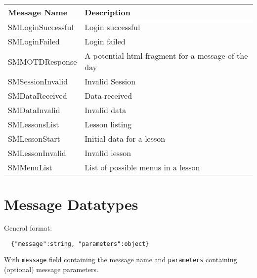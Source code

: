 \documentclass{scrartcl}
\begin{document}
\begin{itemize}
  \begin{tabular}{ll}
    Message Name      & Description \\
    \hline
    SMLoginSuccessful & Login successful \\
    SMLoginFailed     & Login failed \\
    SMMOTDResponse    & A potential html-fragment for a message of the day \\
    SMSessionInvalid  & Invalid Session \\
    SMDataReceived    & Data received \\
    SMDataInvalid     & Invalid data \\
    SMLessonsList     & Lesson listing \\
    SMLessonStart     & Initial data for a lesson \\
    SMLessonInvalid   & Invalid lesson \\
    SMMenuList        & List of possible menus in a lesson \\
  \end{tabular}

\end{itemize}

\section{Message Datatypes}

General format:
\begin{lstlisting}
  {"message":string, "parameters":object}
\end{lstlisting}
With \texttt{message} field containing the message name and \texttt{parameters} containing (optional) message parameters.
\end{document}
